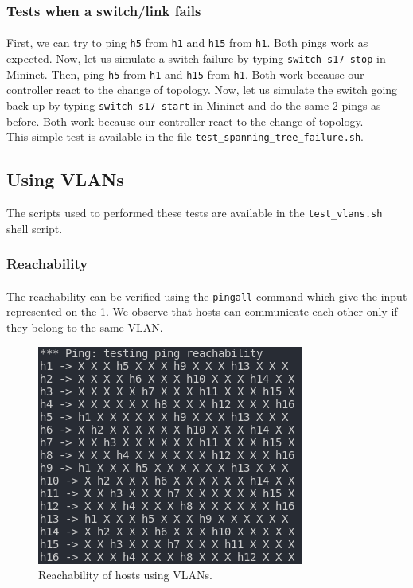 \documentclass[a4paper, 11pt, oneside]{article}
\begin{document}
\subsubsection{Tests when a switch/link fails}
\paragraph{}First, we can try to ping \texttt{h5} from \texttt{h1} and \texttt{h15} from \texttt{h1}. Both pings work as expected. Now, let us simulate a switch failure by typing \texttt{switch s17 stop} in Mininet. Then, ping \texttt{h5} from \texttt{h1} and \texttt{h15} from \texttt{h1}. Both work because our controller react to the change of topology. Now, let us simulate the switch going back up by typing \texttt{switch s17 start} in Mininet and do the same 2 pings as before. Both work because our controller react to the change of topology.\\
This simple test is available in the file \texttt{test\_spanning\_tree\_failure.sh}.

\subsection{Using VLANs}
The scripts used to performed these tests are available in the \texttt{test\_vlans.sh} shell script.
\subsubsection{Reachability}

\paragraph{}The reachability can be verified using the \texttt{pingall} command which give the input represented on the \ref{VLANs_reach}. We observe that hosts can communicate each other only if they belong to the same VLAN.

\begin{figure}[H]
\center
\includegraphics[scale = 2]{VLANs/VLANs_reach.png}
\caption{Reachability of hosts using VLANs.}
\label{VLANs_reach}
\end{figure}
\end{document}
